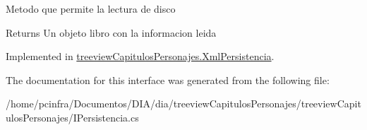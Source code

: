 Metodo que permite la lectura de disco 

\begin{DoxyReturn}{Returns}
Un objeto libro con la informacion leida
\end{DoxyReturn}


Implemented in \hyperlink{classtreeview_capitulos_personajes_1_1_xml_persistencia_a483b876111eda2a3d5f913ba8f3cfc28}{treeview\-Capitulos\-Personajes.\-Xml\-Persistencia}.



The documentation for this interface was generated from the following file\-:\begin{DoxyCompactItemize}
\item 
/home/pcinfra/\-Documentos/\-D\-I\-A/dia/treeview\-Capitulos\-Personajes/treeview\-Capitulos\-Personajes/I\-Persistencia.\-cs\end{DoxyCompactItemize}
